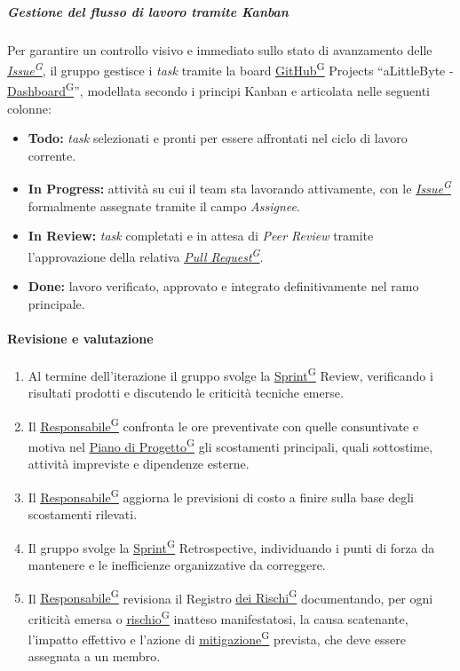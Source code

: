 \documentclass[a4paper,12pt]{article}
\providecommand{\glslink}[2]{\href{https://alittlebyte-19.github.io/Documentazione/glossario.html\#gls-#1}{\underline{#2}\textsuperscript{\scriptsize G}}}
\begin{document}
\subparagraph{Gestione del flusso di lavoro tramite Kanban}
Per garantire un controllo visivo e immediato sullo stato di avanzamento delle \textit{\glslink{issue}{Issue}}, il gruppo gestisce i \textit{task} tramite la board \glslink{github}{GitHub} Projects ``aLittleByte - \glslink{dashboard}{Dashboard}'', modellata secondo i principi Kanban e articolata nelle seguenti colonne:
\begin{itemize}
    \item \textbf{Todo:} \textit{task} selezionati e pronti per essere affrontati nel ciclo di lavoro corrente.
    \item \textbf{In Progress:} attività su cui il team sta lavorando attivamente, con le \textit{\glslink{issue}{Issue}} formalmente assegnate tramite il campo \textit{Assignee}.
    \item \textbf{In Review:} \textit{task} completati e in attesa di \textit{Peer Review} tramite l'approvazione della relativa \textit{\glslink{pull-request}{Pull Request}}.
    \item \textbf{Done:} lavoro verificato, approvato e integrato definitivamente nel ramo principale.
\end{itemize}

\paragraph{Revisione e valutazione}
\begin{enumerate}
    \item Al termine dell'iterazione il gruppo svolge la \glslink{sprint}{Sprint} Review, verificando i risultati prodotti e discutendo le criticità tecniche emerse.
    \item Il \glslink{responsabile}{Responsabile} confronta le ore preventivate con quelle consuntivate e motiva nel \glslink{piano-di-progetto}{Piano di Progetto} gli scostamenti principali, quali sottostime, attività impreviste e dipendenze esterne.
    \item Il \glslink{responsabile}{Responsabile} aggiorna le previsioni di costo a finire sulla base degli scostamenti rilevati.
    \item Il gruppo svolge la \glslink{sprint}{Sprint} Retrospective, individuando i punti di forza da mantenere e le inefficienze organizzative da correggere.
    \item Il \glslink{responsabile}{Responsabile} revisiona il Registro \glslink{mitigazione-dei-rischi}{dei Rischi} documentando, per ogni criticità emersa o \glslink{rischio}{rischio} inatteso manifestatosi, la causa scatenante, l'impatto effettivo e l'azione di \glslink{mitigazione-dei-rischi}{mitigazione} prevista, che deve essere assegnata a un membro.
\end{enumerate}
\end{document}
